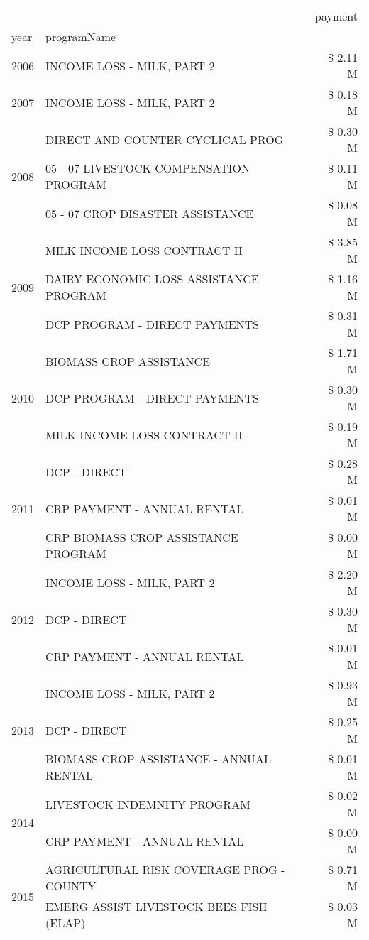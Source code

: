 \begin{tabular}{llr}
\toprule
 &  & payment \\
year & programName &  \\
\midrule
2006 & INCOME LOSS - MILK, PART 2 & \$ 2.11 M \\
\cline{1-3}
2007 & INCOME LOSS - MILK, PART 2 & \$ 0.18 M \\
\cline{1-3}
\multirow[t]{3}{*}{2008} & DIRECT AND COUNTER CYCLICAL PROG & \$ 0.30 M \\
 & 05 - 07 LIVESTOCK COMPENSATION PROGRAM & \$ 0.11 M \\
 & 05 - 07 CROP DISASTER ASSISTANCE & \$ 0.08 M \\
\cline{1-3}
\multirow[t]{3}{*}{2009} & MILK INCOME LOSS CONTRACT II & \$ 3.85 M \\
 & DAIRY ECONOMIC LOSS ASSISTANCE PROGRAM & \$ 1.16 M \\
 & DCP PROGRAM - DIRECT PAYMENTS & \$ 0.31 M \\
\cline{1-3}
\multirow[t]{3}{*}{2010} & BIOMASS CROP ASSISTANCE & \$ 1.71 M \\
 & DCP PROGRAM - DIRECT PAYMENTS & \$ 0.30 M \\
 & MILK INCOME LOSS CONTRACT II & \$ 0.19 M \\
\cline{1-3}
\multirow[t]{3}{*}{2011} & DCP - DIRECT & \$ 0.28 M \\
 & CRP PAYMENT - ANNUAL RENTAL & \$ 0.01 M \\
 & CRP BIOMASS CROP ASSISTANCE PROGRAM & \$ 0.00 M \\
\cline{1-3}
\multirow[t]{3}{*}{2012} & INCOME LOSS - MILK, PART 2 & \$ 2.20 M \\
 & DCP - DIRECT & \$ 0.30 M \\
 & CRP PAYMENT - ANNUAL RENTAL & \$ 0.01 M \\
\cline{1-3}
\multirow[t]{3}{*}{2013} & INCOME LOSS - MILK, PART 2 & \$ 0.93 M \\
 & DCP - DIRECT & \$ 0.25 M \\
 & BIOMASS CROP ASSISTANCE - ANNUAL RENTAL & \$ 0.01 M \\
\cline{1-3}
\multirow[t]{2}{*}{2014} & LIVESTOCK INDEMNITY PROGRAM & \$ 0.02 M \\
 & CRP PAYMENT - ANNUAL RENTAL & \$ 0.00 M \\
\cline{1-3}
\multirow[t]{3}{*}{2015} & AGRICULTURAL RISK COVERAGE PROG - COUNTY & \$ 0.71 M \\
 & EMERG ASSIST LIVESTOCK BEES FISH (ELAP) & \$ 0.03 M \\

\end{tabular}
